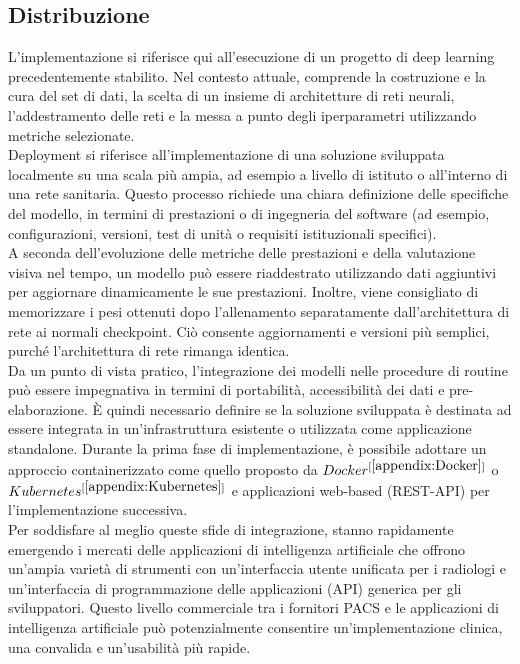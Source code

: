 \documentclass[12pt,a4paper]{report}
\begin{document}
\subsection{Distribuzione}
L'implementazione si riferisce qui all'esecuzione di un progetto di deep learning precedentemente stabilito. Nel contesto attuale, comprende la costruzione e la cura del set di dati, la scelta di un insieme di architetture di reti neurali, l'addestramento delle reti e la messa a punto degli iperparametri utilizzando metriche selezionate.\\
Deployment si riferisce all'implementazione di una soluzione sviluppata localmente su una scala più ampia, ad esempio a livello di istituto o all'interno di una rete sanitaria. Questo processo richiede una chiara definizione delle specifiche del modello, in termini di prestazioni o di ingegneria del software (ad esempio, configurazioni, versioni, test di unità o requisiti istituzionali specifici).\\
A seconda dell'evoluzione delle metriche delle prestazioni e della valutazione visiva nel tempo, un modello può essere riaddestrato utilizzando dati aggiuntivi per aggiornare dinamicamente le sue prestazioni.
Inoltre, viene consigliato di memorizzare i pesi ottenuti dopo l'allenamento separatamente dall'architettura di rete ai normali checkpoint. Ciò consente aggiornamenti e versioni più semplici, purché l'architettura di rete rimanga identica.\\
Da un punto di vista pratico, l'integrazione dei modelli nelle procedure di routine può essere impegnativa in termini di portabilità, accessibilità dei dati e pre-elaborazione. È quindi necessario definire se la soluzione sviluppata è destinata ad essere integrata in un'infrastruttura esistente o utilizzata come applicazione standalone. Durante la prima fase di implementazione, è possibile adottare un approccio containerizzato come quello proposto da $Docker^{[\ref{appendix:Docker}]}$ o $Kubernetes^{[\ref{appendix:Kubernetes}]}$ e applicazioni web-based (REST-API) per l'implementazione successiva.\\
Per soddisfare al meglio queste sfide di integrazione, stanno rapidamente emergendo i mercati delle applicazioni di intelligenza artificiale che offrono un'ampia varietà di strumenti con un'interfaccia utente unificata per i radiologi e un'interfaccia di programmazione delle applicazioni (API) generica per gli sviluppatori. Questo livello commerciale tra i fornitori PACS e le applicazioni di intelligenza artificiale può potenzialmente consentire un'implementazione clinica, una convalida e un'usabilità più rapide.\cite{montagnon2020deep}
\end{document}

